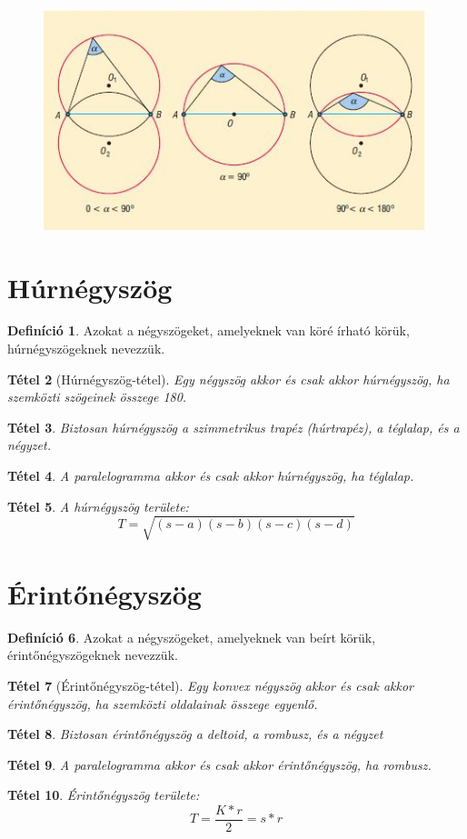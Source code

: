 \documentclass[twoside,12pt]{report}
\newtheorem{theorem}{Tétel}[section]
\theoremstyle{definition}
\newtheorem{definition}[theorem]{Definíció}
\begin{document}
	\begin{figure}[H]
		\centering
		\includegraphics[width=0.7\linewidth]{Lato}
	\end{figure}
\section{Húrnégyszög}
	\begin{definition}
		Azokat a négyszögeket, amelyeknek van köré írható körük, húrnégyszögeknek nevezzük.
	\end{definition}
	\begin{theorem}[Húrnégyszög-tétel]
		Egy négyszög akkor és csak akkor húrnégyszög, ha szemközti szögeinek összege 180\degree.
	\end{theorem}
	\begin{theorem}
		Biztosan húrnégyszög a szimmetrikus trapéz (húrtrapéz), a téglalap, és a négyzet.
	\end{theorem}
	\begin{theorem}
		A paralelogramma akkor és csak akkor húrnégyszög, ha téglalap.
	\end{theorem}
	\begin{theorem}
		A húrnégyszög területe:
		\begin{equation*}
			T=\sqrt{(s-a)(s-b)(s-c)(s-d)}
		\end{equation*}
	\end{theorem}
\section{Érintőnégyszög}
	\begin{definition}
		Azokat a négyszögeket, amelyeknek van beírt körük, érintőnégyszögeknek nevezzük.
	\end{definition}
	\begin{theorem}[Érintőnégyszög-tétel]
		Egy konvex négyszög akkor és csak akkor érintőnégyszög, ha szemközti oldalainak összege egyenlő.
	\end{theorem}
	\begin{theorem}
		Biztosan érintőnégyszög a deltoid, a rombusz, és a négyzet
	\end{theorem}
	\begin{theorem}
		A paralelogramma akkor és csak akkor érintőnégyszög, ha rombusz.
	\end{theorem}
	\begin{theorem}
		Érintőnégyszög területe:
		\begin{equation*}
			T=\frac{K*r}{2}=s*r
		\end{equation*}
	\end{theorem}
\end{document}
